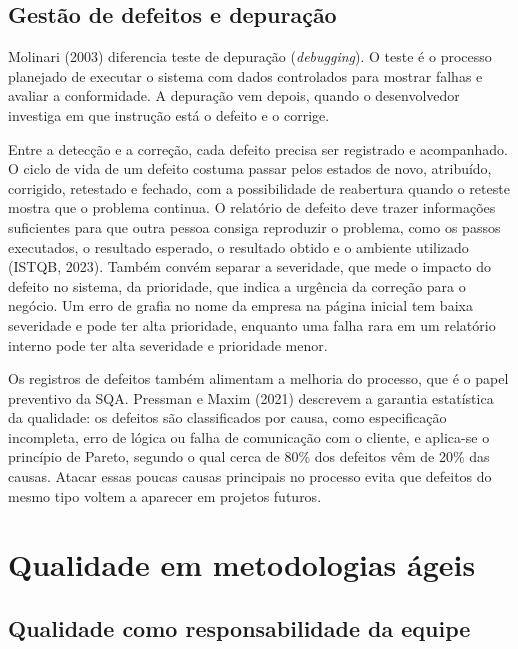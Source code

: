 \documentclass[12pt,a4paper]{article}
\begin{document}
\subsection{Gestão de defeitos e depuração}

Molinari (2003) diferencia teste de depuração (\textit{debugging}). O teste é o processo planejado de executar o sistema com dados controlados para mostrar falhas e avaliar a conformidade. A depuração vem depois, quando o desenvolvedor investiga em que instrução está o defeito e o corrige.

Entre a detecção e a correção, cada defeito precisa ser registrado e acompanhado. O ciclo de vida de um defeito costuma passar pelos estados de novo, atribuído, corrigido, retestado e fechado, com a possibilidade de reabertura quando o reteste mostra que o problema continua. O relatório de defeito deve trazer informações suficientes para que outra pessoa consiga reproduzir o problema, como os passos executados, o resultado esperado, o resultado obtido e o ambiente utilizado (ISTQB, 2023). Também convém separar a severidade, que mede o impacto do defeito no sistema, da prioridade, que indica a urgência da correção para o negócio. Um erro de grafia no nome da empresa na página inicial tem baixa severidade e pode ter alta prioridade, enquanto uma falha rara em um relatório interno pode ter alta severidade e prioridade menor.

Os registros de defeitos também alimentam a melhoria do processo, que é o papel preventivo da SQA. Pressman e Maxim (2021) descrevem a garantia estatística da qualidade: os defeitos são classificados por causa, como especificação incompleta, erro de lógica ou falha de comunicação com o cliente, e aplica-se o princípio de Pareto, segundo o qual cerca de 80\% dos defeitos vêm de 20\% das causas. Atacar essas poucas causas principais no processo evita que defeitos do mesmo tipo voltem a aparecer em projetos futuros.

\section{Qualidade em metodologias ágeis}
\label{sec:ageis}

\subsection{Qualidade como responsabilidade da equipe}
\end{document}

